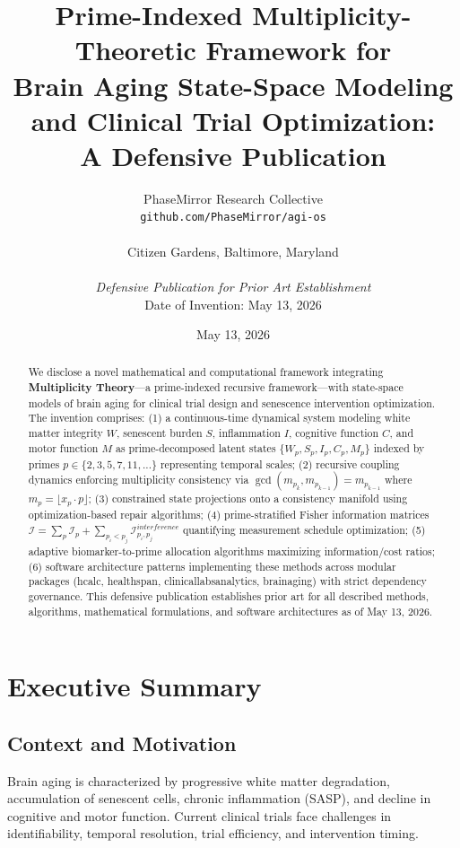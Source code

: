 \documentclass[11pt,letterpaper]{article}
\title{\textbf{Prime-Indexed Multiplicity-Theoretic Framework for \\
Brain Aging State-Space Modeling and Clinical Trial Optimization: \\
A Defensive Publication}}
\author{
  PhaseMirror Research Collective \\
  \texttt{github.com/PhaseMirror/agi-os} \\
  \\
  Citizen Gardens, Baltimore, Maryland \\
  \\
  \textit{Defensive Publication for Prior Art Establishment} \\
  Date of Invention: May 13, 2026
}
\date{May 13, 2026}
\begin{document}
\maketitle

\begin{abstract}
We disclose a novel mathematical and computational framework integrating \textbf{Multiplicity Theory}---a prime-indexed recursive framework---with state-space models of brain aging for clinical trial design and senescence intervention optimization. The invention comprises: (1) a continuous-time dynamical system modeling white matter integrity $W$, senescent burden $S$, inflammation $I$, cognitive function $C$, and motor function $M$ as prime-decomposed latent states $\{W_p, S_p, I_p, C_p, M_p\}$ indexed by primes $p \in \{2,3,5,7,11,...\}$ representing temporal scales; (2) recursive coupling dynamics enforcing multiplicity consistency via $\gcd(m_{p_k}, m_{p_{k-1}}) = m_{p_{k-1}}$ where $m_p = \lfloor x_p \cdot p \rfloor$; (3) constrained state projections onto a consistency manifold using optimization-based repair algorithms; (4) prime-stratified Fisher information matrices $\mathcal{I} = \sum_p \mathcal{I}_p + \sum_{p_i < p_j} \mathcal{I}_{p_i,p_j}^{interference}$ quantifying measurement schedule optimization; (5) adaptive biomarker-to-prime allocation algorithms maximizing information/cost ratios; (6) software architecture patterns implementing these methods across modular packages (hcalc, healthspan, clinicallabsanalytics, brainaging) with strict dependency governance. This defensive publication establishes prior art for all described methods, algorithms, mathematical formulations, and software architectures as of May 13, 2026.
\end{abstract}
\newpage
\tableofcontents
\newpage


\section{Executive Summary}

\subsection{Context and Motivation}

Brain aging is characterized by progressive white matter degradation, accumulation of senescent cells, chronic inflammation (SASP), and decline in cognitive and motor function. Current clinical trials face challenges in identifiability, temporal resolution, trial efficiency, and intervention timing.
\end{document}
